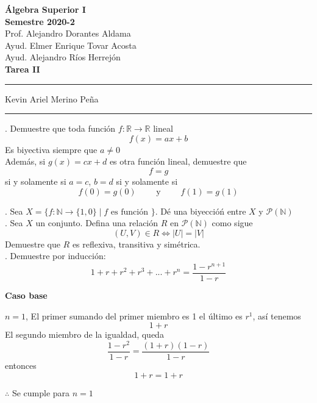 \documentclass[letterpaper]{article}
\providecommand{\abs}[1]{\left|#1\right|}
\newcommand{\R}{\mathds{R}}
\newcommand{\N}{\mathds{N}}
\renewcommand{\P}{\mathcal{P}}
\renewcommand{\*}{\cdot}
\theoremstyle{definition}
\begin{document}
\begin{center}
	\vspace{-114pt}
	\textbf{\large Álgebra Superior I}\\
	\textbf{ Semestre 2020-2}\\
	Prof. Alejandro Dorantes Aldama\\
	Ayud. Elmer Enrique Tovar Acosta \\
	Ayud. Alejandro Ríos Herrejón \\
	\textbf{Tarea II}
\rule{19cm}{0.3mm}
	\begin{center}
Kevin Ariel Merino Peña
	\end{center}
	\vspace{-14pt}
\rule{19cm}{-0.3mm}
\end{center}
. Demuestre que toda función $ f: \R \to \R $ lineal 
\[ f(x) = ax +b \]
Es biyectiva siempre que $ a \neq 0 $\\

Además, si $ g(x) = cx + d $ es otra función lineal, demuestre que \[f = g\] si y solamente si $a = c $, $ b = d $ si y solamente si \[ f(0) = g(0) \qquad \text{ y } \qquad f(1) = g(1) \]




. Sea $ X = \{ f: \N \to \{1,0\} \mid f \text{ es función } \}  $. Dé una biyeccióń entre $ X $ y $ \P(\N) $\\


. Sea $ X $ un conjunto. Defina una relación $ R $ en $ \P(\N) $ como sigue
\[ (U,V) \in R \iff \abs{U} = \abs{V} \]
Demuestre que $ R $ es reflexiva, transitiva y simétrica.\\


. Demuestre por inducción:
$$1+r+r^2+r^3+...+r^n=\frac{1-r^{n+1}}{1-r}$$
\begin{flushright}
	\textbf{Caso base} 
\end{flushright}
$ n=1 $, El primer sumando del primer miembro es 1 el último es $r^1$, así tenemos\\
$$1+r$$ 
El segundo miembro de la igualdad, queda $$\frac{1-r^2}{1-r}=\frac{(1+r)(1-r)}{1-r}$$
entonces $$1+r=1+r$$ 
\begin{center}
	$ \therefore $  Se cumple para $n=1$
\end{center}
\end{document}
